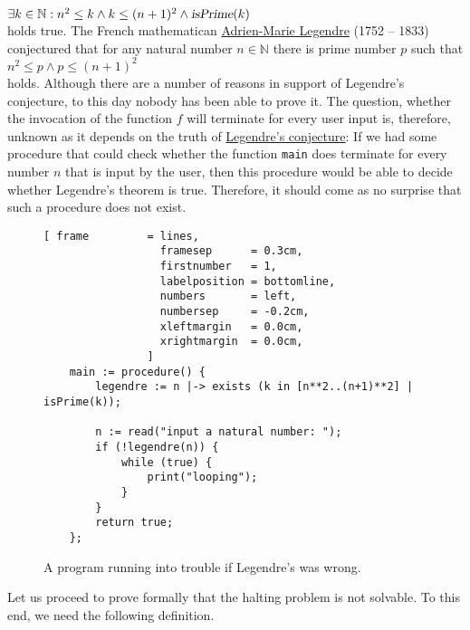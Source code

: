 \hspace*{1.3cm}
$\exists k \in \mathbb{N}: n^2 \leq k \wedge k \leq (n+1)^2 \wedge \textsl{isPrime}(k)$
\\[0.2cm]
holds true.  The French mathematican 
\href{http://en.wikipedia.org/wiki/Adrien-Marie_Legendre}{Adrien-Marie Legendre} (1752 -- 1833) conjectured that
for any natural number $n \in \mathbb{N}$ there is prime number $p$ such that
\\[0.2cm]
\hspace*{1.3cm}
$n^2 \leq p \wedge  p \leq (n+1)^2$
\\[0.2cm]
holds.  Although there are a number of reasons in support of Legendre's conjecture,  to this day
nobody has been able to prove it.  The question, whether the invocation of the function $f$ will
terminate for every user input is, therefore, unknown as it depends on the truth of 
\href{http://en.wikipedia.org/wiki/Legendre's_conjecture}{Legendre's conjecture}:  If we
had some procedure that could check whether the function \texttt{main} does terminate for every number
$n$ that is input by the user,
then this procedure would be able to decide whether Legendre's theorem is true.  Therefore, it
should come as no surprise that such a procedure does not exist.


\begin{figure}[!ht]
\centering
\begin{Verbatim}[ frame         = lines, 
                  framesep      = 0.3cm, 
                  firstnumber   = 1,
                  labelposition = bottomline,
                  numbers       = left,
                  numbersep     = -0.2cm,
                  xleftmargin   = 0.0cm,
                  xrightmargin  = 0.0cm,
                ]
    main := procedure() {
        legendre := n |-> exists (k in [n**2..(n+1)**2] | isPrime(k));

        n := read("input a natural number: ");
        if (!legendre(n)) {
            while (true) {
                print("looping");
            } 
        }
        return true;
    };
\end{Verbatim}
\vspace*{-0.3cm}
\caption{A program running into trouble if Legendre's was wrong.}
\label{fig:legendre.stlx}
\end{figure}

Let us proceed to prove formally that the halting problem is not solvable.  To this end, we need the
following definition.

